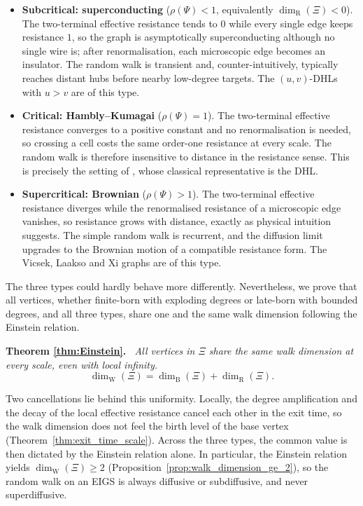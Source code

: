 \documentclass{article}
\DeclareRobustCommand{\revision}[1]{{\color{red}#1}}
\newenvironment{restated}[1]{%
  \par\noindent\textbf{Theorem #1.}\itshape\ }%
  {\par}
\theoremstyle{plain}
\theoremstyle{definition}
\newcommand{\dimbox}{\dim_\mathrm{B}}
\newcommand{\dimwalk}{\dim_\mathrm{W}}
\newcommand{\dimresis}{\dim_\mathrm{R}}
\begin{document}
\begin{itemize}
\item \textbf{Subcritical: superconducting} ($\rho(\Psi)<1$, equivalently $\dimresis(\Xi)<0$).
The two-terminal effective resistance tends to $0$ while every single edge keeps resistance $1$, so the graph is asymptotically superconducting although no single wire is; after renormalisation, each microscopic edge becomes an insulator.
The random walk is transient and, counter-intuitively, typically reaches distant hubs before nearby low-degree targets.
\revision{The $(u,v)$-DHLs with $u>v$ are of this type.}
\item \textbf{Critical: Hambly--Kumagai} ($\rho(\Psi)=1$).
The two-terminal effective resistance converges to a positive constant and no renormalisation is needed, so crossing a cell costs the same order-one resistance at every scale.
The random walk is therefore insensitive to distance in the resistance sense.
This is precisely the setting of \cite{hambly2010diffusion}, whose classical representative is the DHL.
\item \textbf{Supercritical: Brownian} ($\rho(\Psi)>1$).
The two-terminal effective resistance diverges while the renormalised resistance of a microscopic edge vanishes, so resistance grows with distance, exactly as physical intuition suggests.
The simple random walk is recurrent, and the diffusion limit upgrades to the Brownian motion of a compatible resistance form.
The Vicsek, Laakso and Xi graphs are of this type.
\end{itemize}

The three types could hardly behave more differently.
Nevertheless, we prove that all vertices, whether finite-born with exploding degrees or late-born with bounded degrees, and all three types, share one and the same walk dimension following the Einstein relation.

\begin{restated}{\ref{thm:Einstein}}
All vertices in $\Xi$ share the same walk dimension at every scale, even with local infinity.
\[
\dimwalk(\Xi)=\dimbox(\Xi)+\dimresis(\Xi).
\]
\end{restated}

Two cancellations lie behind this uniformity.
Locally, the degree amplification and the decay of the local effective resistance cancel each other in the exit time, so the walk dimension does not feel the birth level of the base vertex (Theorem~\ref{thm:exit_time_scale}).
Across the three types, the common value is then dictated by the Einstein relation alone.
In particular, the Einstein relation yields $\dimwalk(\Xi)\ge 2$ (Proposition~\ref{prop:walk_dimension_ge_2}), so the random walk on an EIGS is always diffusive or subdiffusive, and never superdiffusive.
\end{document}
